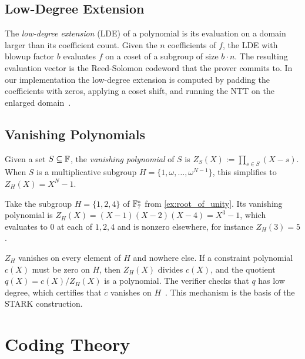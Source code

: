 \subsection{Low-Degree Extension}
\label{subsec:lde}

The \emph{low-degree extension} (LDE) of a polynomial is its
evaluation on a domain larger than its coefficient count. Given the
$n$ coefficients of $f$, the LDE with blowup factor $b$ evaluates $f$
on a coset of a subgroup of size $b \cdot n$. The resulting evaluation
vector is the Reed-Solomon codeword that the prover commits to. In our
implementation the low-degree extension is computed by padding the
coefficients with zeros, applying a coset shift, and running the NTT
on the enlarged domain~\cite[Section~3.4]{ethSTARK}.

\subsection{Vanishing Polynomials}
\label{subsec:vanishing}

\begin{definition}
\label{def:vanishing}
Given a set $S \subseteq \mathbb{F}$, the \emph{vanishing polynomial} of $S$
is $Z_S(X) := \prod_{s \in S}(X - s)$. When $S$ is a multiplicative
subgroup $H = \{1, \omega, \ldots, \omega^{N-1}\}$, this simplifies
to $Z_H(X) = X^N - 1$.
\end{definition}

\begin{example}
\label{ex:vanishing}
Take the subgroup $H = \{1, 2, 4\}$ of $\mathbb{F}_7^*$ from
\cref{ex:root_of_unity}. Its vanishing polynomial is
$Z_H(X) = (X-1)(X-2)(X-4) = X^3 - 1$, which evaluates to $0$ at each of
$1, 2, 4$ and is nonzero elsewhere, for instance $Z_H(3) = 5$.
\end{example}

$Z_H$ vanishes on every element of $H$ and nowhere else. If a
constraint polynomial $c(X)$ must be zero on $H$, then $Z_H(X)$
divides $c(X)$, and the quotient $q(X) = c(X)/Z_H(X)$ is a
polynomial. The verifier checks that $q$ has low degree, which
certifies that $c$ vanishes on $H$~\cite{ethSTARK}. This mechanism is
the basis of the STARK construction.

\section{Coding Theory}
\label{sec:coding_theory}

